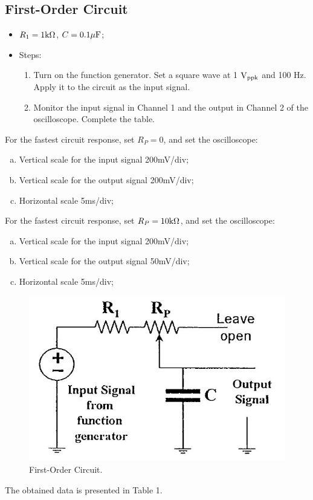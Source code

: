 \documentclass[a4paper]{report}
\begin{document}
	\subsection{First-Order Circuit}
	\begin{itemize}
		\item $R_1=1\rm{k}\Omega$, $C=0.1\mu\rm{F}$;
		\item Steps:
		\begin{enumerate}[1.]
			\item Turn on the function generator. Set a square wave at 1 $\rm{V_{ppk}}$ and 100 Hz. Apply it to the circuit as the input signal.
			\item Monitor the input signal in Channel 1 and the output in Channel 2 of the oscilloscope. Complete the table.
		\end{enumerate}
	\end{itemize}
	For the fastest circuit response, set $R_P=0$, and set the oscilloscope:
	\begin{enumerate}[a)]
		\item Vertical scale for the input signal 200mV/div;
		\item Vertical scale for the output signal 200mV/div;
		\item Horizontal scale 5ms/div;
	\end{enumerate}
	For the fastest circuit response, set $R_P=10\rm{k}\Omega$, and set the oscilloscope:
	\begin{enumerate}[a)]
		\item Vertical scale for the input signal 200mV/div;
		\item Vertical scale for the output signal 50mV/div;
		\item Horizontal scale 5ms/div;
	\end{enumerate}
	\begin{figure}[H]
		\centering
		\includegraphics[width=0.8\linewidth]{1.jpg}
		\caption{First-Order Circuit.}
	\end{figure}
	The obtained data is presented in Table 1.
\end{document}

